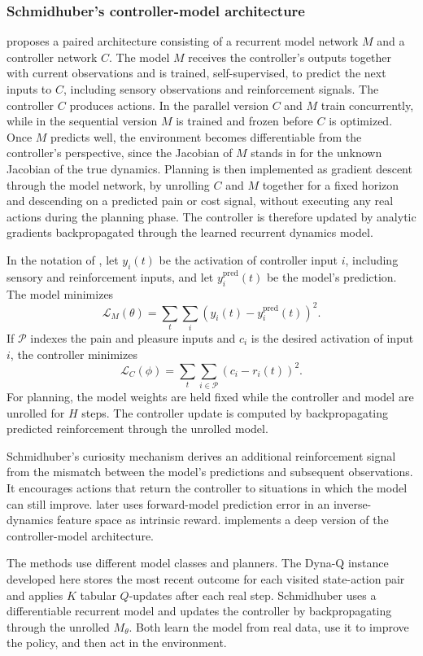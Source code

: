 \subsubsection{Schmidhuber's controller-model architecture}
\label{section:fc_origins_schmidhuber}

\citet{Schmidhuber1990} proposes a paired architecture consisting of a recurrent model network $M$ and a controller network $C$. The model $M$ receives the controller's outputs together with current observations and is trained, self-supervised, to predict the next inputs to $C$, including sensory observations and reinforcement signals. The controller $C$ produces actions. In the parallel version $C$ and $M$ train concurrently, while in the sequential version $M$ is trained and frozen before $C$ is optimized. Once $M$ predicts well, the environment becomes differentiable from the controller's perspective, since the Jacobian of $M$ stands in for the unknown Jacobian of the true dynamics. Planning is then implemented as gradient descent through the model network, by unrolling $C$ and $M$ together for a fixed horizon and descending on a predicted pain or cost signal, without executing any real actions during the planning phase. The controller is therefore updated by analytic gradients backpropagated through the learned recurrent dynamics model.

In the notation of \citet{Schmidhuber1990}, let $y_i(t)$ be the activation of controller input $i$, including sensory and reinforcement inputs, and let $y_i^{\mathrm{pred}}(t)$ be the model's prediction. The model minimizes
\[
  \mathcal{L}_M(\theta)
  =
  \sum_t \sum_i
  \left(y_i(t)-y_i^{\mathrm{pred}}(t)\right)^2.
\]
If $\mathcal{P}$ indexes the pain and pleasure inputs and $c_i$ is the desired activation of input $i$, the controller minimizes
\[
  \mathcal{L}_C(\phi)
  =
  \sum_t \sum_{i \in \mathcal{P}}
  \left(c_i-r_i(t)\right)^2.
\]
For planning, the model weights are held fixed while the controller and model are unrolled for $H$ steps. The controller update is computed by backpropagating predicted reinforcement through the unrolled model.

Schmidhuber's curiosity mechanism derives an additional reinforcement signal from the mismatch between the model's predictions and subsequent observations. It encourages actions that return the controller to situations in which the model can still improve. \citet{Pathak2017} later uses forward-model prediction error in an inverse-dynamics feature space as intrinsic reward. \citet{HaSchmidhuber2018} implements a deep version of the controller-model architecture.

The methods use different model classes and planners. The Dyna-Q instance developed here stores the most recent outcome for each visited state-action pair and applies $K$ tabular $Q$-updates after each real step. Schmidhuber uses a differentiable recurrent model and updates the controller by backpropagating through the unrolled $M_\theta$. Both learn the model from real data, use it to improve the policy, and then act in the environment.
